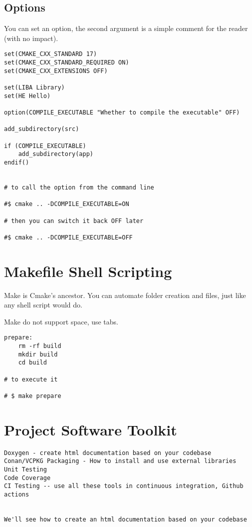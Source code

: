 \subsection{Options}

You can set an option, the second argument is a simple comment for the reader (with no impact).

\begin{verbatim}
set(CMAKE_CXX_STANDARD 17)
set(CMAKE_CXX_STANDARD_REQUIRED ON)
set(CMAKE_CXX_EXTENSIONS OFF)

set(LIBA Library)
set(HE Hello)

option(COMPILE_EXECUTABLE "Whether to compile the executable" OFF)

add_subdirectory(src)

if (COMPILE_EXECUTABLE)
    add_subdirectory(app)
endif()


# to call the option from the command line

#$ cmake .. -DCOMPILE_EXECUTABLE=ON

# then you can switch it back OFF later

#$ cmake .. -DCOMPILE_EXECUTABLE=OFF
\end{verbatim}


\section{Makefile Shell Scripting}

Make is Cmake's ancestor. You can automate folder creation and files, just like any shell script would do. 

Make do not support space, use tabs.

\begin{verbatim}
prepare:
    rm -rf build
    mkdir build
    cd build

# to execute it

# $ make prepare
\end{verbatim}



\section{Project Software Toolkit}

\begin{verbatim}
Doxygen - create html documentation based on your codebase
Conan/VCPKG Packaging - How to install and use external libraries
Unit Testing
Code Coverage
CI Testing -- use all these tools in continuous integration, Github actions


We'll see how to create an html documentation based on your codebase
\end{verbatim}

